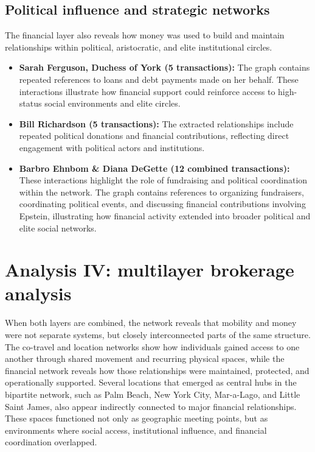 \subsection{Political influence and strategic networks}
The financial layer also reveals how money was used to build and maintain relationships within political, aristocratic, and elite institutional circles.
\begin{itemize}
    \item \textbf{Sarah Ferguson, Duchess of York (5 transactions):} The graph contains repeated references to loans and debt payments made on her behalf. These interactions illustrate how financial support could reinforce access to high-status social environments and elite circles.
    \item \textbf{Bill Richardson (5 transactions):} The extracted relationships include repeated political donations and financial contributions, reflecting direct engagement with political actors and institutions.
    \item \textbf{Barbro Ehnbom \& Diana DeGette (12 combined transactions):} These interactions highlight the role of fundraising and political coordination within the network. The graph contains references to organizing fundraisers, coordinating political events, and discussing financial contributions involving Epstein, illustrating how financial activity extended into broader political and elite social networks.
\end{itemize}

\section{Analysis IV: multilayer brokerage analysis}
When both layers are combined, the network reveals that mobility and money were not separate systems, but closely interconnected parts of the same structure. The co-travel and location networks show how individuals gained access to one another through shared movement and recurring physical spaces, while the financial network reveals how those relationships were maintained, protected, and operationally supported.
Several locations that emerged as central hubs in the bipartite network, such as Palm Beach, New York City, Mar-a-Lago, and Little Saint James, also appear indirectly connected to major financial relationships. These spaces functioned not only as geographic meeting points, but as environments where social access, institutional influence, and financial coordination overlapped.

